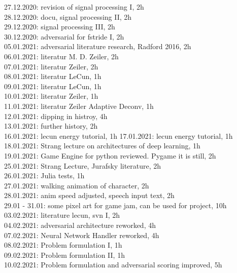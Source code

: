 27.12.2020: revision of signal processing I, 2h\\
28.12.2020: docu, signal processing II, 2h\\
29.12.2020: signal processing III, 2h\\
30.12.2020: adversarial for fstride I, 2h\\
05.01.2021: adversarial literature research, Radford 2016, 2h\\

06.01.2021: literatur M. D. Zeiler, 2h\\
07.01.2021: literatur Zeiler, 2h\\
08.01.2021: literatur LeCun, 1h\\
09.01.2021: literatur LeCun, 1h\\
10.01.2021: literatur Zeiler, 1h\\
11.01.2021: literatur Zeiler Adaptive Deconv, 1h\\
12.01.2021: dipping in histroy, 4h\\

13.01.2021: further history, 2h\\
16.01.2021: lecun energy tutorial, 1h
17.01.2021: lecun energy tutorial, 1h\\
18.01.2021: Strang lecture on architectures of deep learning, 1h\\
19.01.2021: Game Engine for python reviewed. Pygame it is still, 2h\\
25.01.2021: Strang Lecture, Jurafsky literature, 2h\\

26.01.2021: Julia tests, 1h\\
27.01.2021: walking animation of character, 2h\\
28.01.2021: anim speed adjusted, speech input text, 2h\\
29.01 - 31.01: some pixel art for game jam, can be used for project, 10h\\

03.02.2021: literature lecun, svn I, 2h\\
04.02.2021: adversarial architecture reworked, 4h\\

07.02.2021: Neural Network Handler reworked, 4h\\
08.02.2021: Problem formulation I, 1h\\
09.02.2021: Problem formulation II, 1h\\
10.02.2021: Problem formulation and adversarial scoring improved, 5h\\

